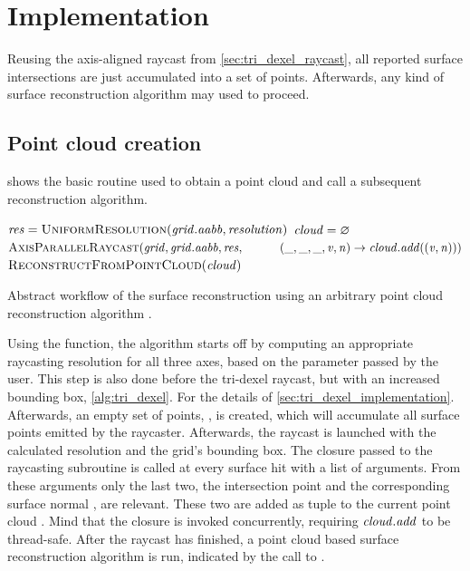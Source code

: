 \section{Implementation}
\label{sec:point_cloud_implementation}

Reusing the axis-aligned raycast from \cref{sec:tri_dexel_raycast}, all reported surface intersections are just accumulated into a set of points.
Afterwards, any kind of surface reconstruction algorithm may used to proceed.

\subsection{Point cloud creation}
\label{sec:point_cloud_creation}

 shows the basic routine used to obtain a point cloud and call a subsequent reconstruction algorithm.
%
\begin{algorithm}
	\centering
	\begin{algorithmic}[1]
			\State $\var{res} = \Call{UniformResolution}{\var{grid}.\var{aabb}, \var{resolution}}$
			\State $\mathit{cloud} = \varnothing$
			\State $\Call{AxisParallelRaycast}{\var{grid}, \var{grid}.\var{aabb}, \var{res},\hfill\break
				\hspace*{\dimexpr\algorithmicindent*2}(\var{\_}, \var{\_}, \var{\_}, \var{v}, \var{n}) \rightarrow \var{cloud}.\var{add}((\var{v}, \var{n}))}$
			\State \Return $\Call{ReconstructFromPointCloud}{\var{cloud}}$
		\EndFunction
	\end{algorithmic}
	\caption{
		Abstract workflow of the surface reconstruction using an arbitrary point cloud reconstruction algorithm .
	}
	\label{alg:point_cloud_based}
\end{algorithm}
%
Using the  function, the algorithm starts off by computing an appropriate raycasting resolution  for all three axes, based on the  parameter passed by the user.
This step is also done before the tri-dexel raycast, but with an increased bounding box, \cf \cref{alg:tri_dexel}.
For the details of  \cf \cref{sec:tri_dexel_implementation}.
Afterwards, an empty set of points, , is created, which will accumulate all surface points emitted by the raycaster.
Afterwards, the raycast is launched with the calculated resolution and the grid's bounding box.
The closure passed to the raycasting subroutine  is called at every surface hit with a list of arguments.
From these arguments only the last two, the intersection point  and the corresponding surface normal , are relevant.
These two are added as tuple to the current point cloud .
Mind that the closure is invoked concurrently, requiring $\mathit{cloud}.\mathit{add}$ to be thread-safe.
After the raycast has finished, a point cloud based surface reconstruction algorithm is run, indicated by the call to .

